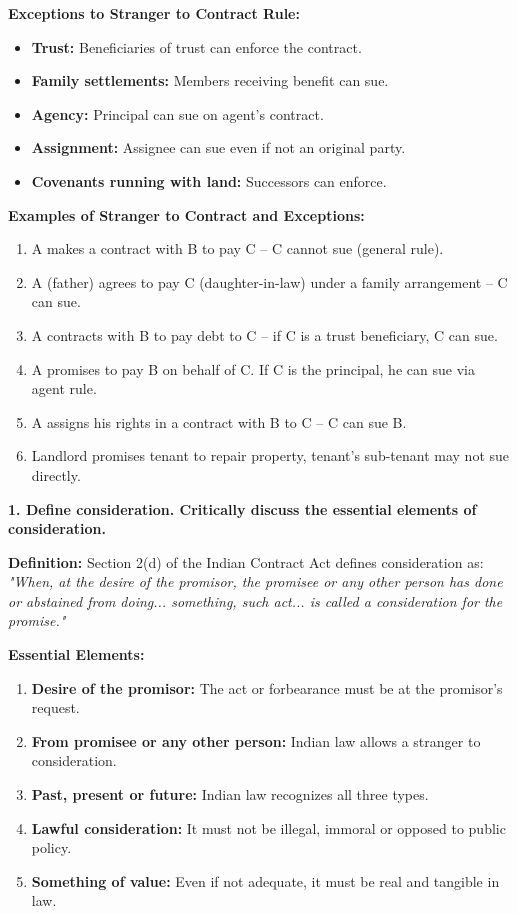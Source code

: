 \documentclass[12pt,a4paper]{book}
\begin{document}
\vspace{0.3cm}
\textbf{Exceptions to Stranger to Contract Rule:}
\begin{itemize}
    \item \textbf{Trust:} Beneficiaries of trust can enforce the contract.
    \item \textbf{Family settlements:} Members receiving benefit can sue.
    \item \textbf{Agency:} Principal can sue on agent’s contract.
    \item \textbf{Assignment:} Assignee can sue even if not an original party.
    \item \textbf{Covenants running with land:} Successors can enforce.
\end{itemize}

\vspace{0.3cm}
\textbf{Examples of Stranger to Contract and Exceptions:}
\begin{enumerate}
    \item A makes a contract with B to pay C – C cannot sue (general rule).
    \item A (father) agrees to pay C (daughter-in-law) under a family arrangement – C can sue.
    \item A contracts with B to pay debt to C – if C is a trust beneficiary, C can sue.
    \item A promises to pay B on behalf of C. If C is the principal, he can sue via agent rule.
    \item A assigns his rights in a contract with B to C – C can sue B.
    \item Landlord promises tenant to repair property, tenant’s sub-tenant may not sue directly.
\end{enumerate}

\vspace{0.5cm}

\textbf{1. Define consideration. Critically discuss the essential elements of consideration.}

\textbf{Definition:}  
Section 2(d) of the Indian Contract Act defines consideration as:  
\textit{"When, at the desire of the promisor, the promisee or any other person has done or abstained from doing... something, such act... is called a consideration for the promise."}

\textbf{Essential Elements:}
\begin{enumerate}
    \item \textbf{Desire of the promisor:} The act or forbearance must be at the promisor’s request.
    \item \textbf{From promisee or any other person:} Indian law allows a stranger to consideration.
    \item \textbf{Past, present or future:} Indian law recognizes all three types.
    \item \textbf{Lawful consideration:} It must not be illegal, immoral or opposed to public policy.
    \item \textbf{Something of value:} Even if not adequate, it must be real and tangible in law.
\end{enumerate}
\end{document}
